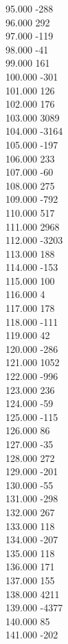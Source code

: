 { 95.000	-288 \\
 96.000	292 \\
 97.000	-119 \\
 98.000	-41 \\
 99.000	161 \\
 100.000	-301 \\
 101.000	126 \\
 102.000	176 \\
 103.000	3089 \\
 104.000	-3164 \\
 105.000	-197 \\
 106.000	233 \\
 107.000	-60 \\
 108.000	275 \\
 109.000	-792 \\
 110.000	517 \\
 111.000	2968 \\
 112.000	-3203 \\
 113.000	188 \\
 114.000	-153 \\
 115.000	100 \\
 116.000	4 \\
 117.000	178 \\
 118.000	-111 \\
 119.000	42 \\
 120.000	-286 \\
 121.000	1052 \\
 122.000	-996 \\
 123.000	236 \\
 124.000	-59 \\
 125.000	-115 \\
 126.000	86 \\
 127.000	-35 \\
 128.000	272 \\
 129.000	-201 \\
 130.000	-55 \\
 131.000	-298 \\
 132.000	267 \\
 133.000	118 \\
 134.000	-207 \\
 135.000	118 \\
 136.000	171 \\
 137.000	155 \\
 138.000	4211 \\
 139.000	-4377 \\
 140.000	85 \\
 141.000	-202 \\
}
